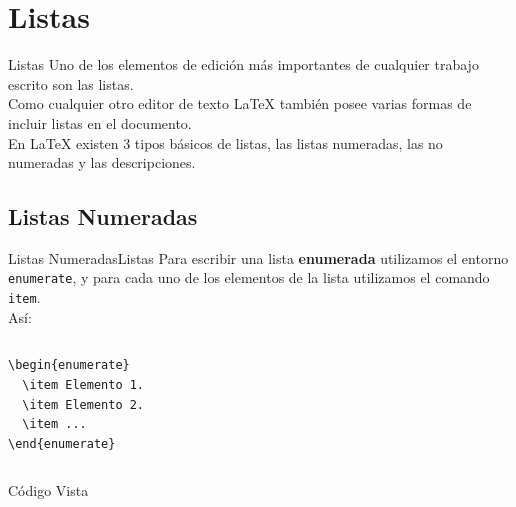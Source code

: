 \documentclass[12pt,aspectratio=43]{beamer}
\newcommand{\lmr}{\fontfamily{lmr}\selectfont}
\begin{document}
\section{Listas}
\begin{frame}{Listas}{}
Uno de los elementos de edición más importantes de cualquier trabajo escrito son las listas.\pause\\[1em]

Como cualquier otro editor de texto {\lmr\LaTeX} también posee varias formas de incluir listas en el documento.\pause\\[1em]

En {\lmr\LaTeX} existen 3 tipos básicos de listas, las listas \alert{numeradas}, las \alert{no numeradas} y las \alert{descripciones}.
\end{frame}

\subsection{Listas Numeradas}
\begin{frame}[fragile]{Listas Numeradas}{Listas}
Para escribir una lista \alert{\bf enumerada} utilizamos el entorno {\tt enumerate}, y para cada uno de los elementos de la lista utilizamos el comando {\tt item}.\pause\\[1em]

Así:
\begin{columns}
	\begin{column}{0.5\linewidth}
		{\small
\begin{lstlisting}
\begin{enumerate}
  \item Elemento 1.
  \item Elemento 2.
  \item ...
\end{enumerate}
\end{lstlisting} }
	\end{column}
	\vline
	\hspace{1em}
	\begin{column}{0.5\linewidth}
		{\lmr{\small
				1. Elemento 1.\\
				2. Elemento 2.\\
				3. ... }}
	\end{column}
\end{columns}
{\color{Ired} Código}\hfill{\color{Ired} Vista}
\end{frame}
\end{document}
